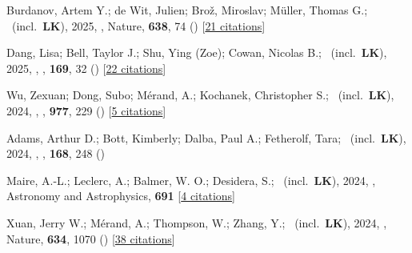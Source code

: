 \item[{\color{numcolor}\scriptsize129}] Burdanov, Artem Y.; de Wit, Julien; Bro{\v{z}}, Miroslav; M{\"u}ller, Thomas G.; \etal\ (incl.\ \textbf{LK}), 2025, , Nature, \textbf{638}, 74 () [\href{https://ui.adsabs.harvard.edu/abs/2025Natur.638...74B}{21 citations}]

\item[{\color{numcolor}\scriptsize128}] Dang, Lisa; Bell, Taylor J.; Shu, Ying (Zoe); Cowan, Nicolas B.; \etal\ (incl.\ \textbf{LK}), 2025, , \aj, \textbf{169}, 32 () [\href{https://ui.adsabs.harvard.edu/abs/2025AJ....169...32D}{22 citations}]

\item[{\color{numcolor}\scriptsize127}] Wu, Zexuan; Dong, Subo; M{\'e}rand, A.; Kochanek, Christopher S.; \etal\ (incl.\ \textbf{LK}), 2024, , \apj, \textbf{977}, 229 () [\href{https://ui.adsabs.harvard.edu/abs/2024ApJ...977..229W}{5 citations}]

\item[{\color{numcolor}\scriptsize126}] Adams, Arthur D.; Bott, Kimberly; Dalba, Paul A.; Fetherolf, Tara; \etal\ (incl.\ \textbf{LK}), 2024, , \aj, \textbf{168}, 248 ()

\item[{\color{numcolor}\scriptsize125}] Maire, A.-L.; Leclerc, A.; Balmer, W. O.; Desidera, S.; \etal\ (incl.\ \textbf{LK}), 2024, , Astronomy and Astrophysics, \textbf{691} [\href{https://ui.adsabs.harvard.edu/abs/2024A&A...691A.263M}{4 citations}]

\item[{\color{numcolor}\scriptsize124}] Xuan, Jerry W.; M{\'e}rand, A.; Thompson, W.; Zhang, Y.; \etal\ (incl.\ \textbf{LK}), 2024, , Nature, \textbf{634}, 1070 () [\href{https://ui.adsabs.harvard.edu/abs/2024Natur.634.1070X}{38 citations}]


